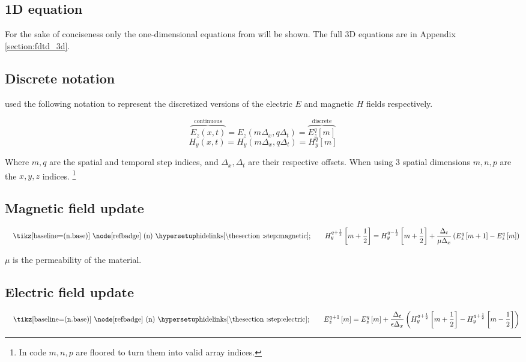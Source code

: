 \documentclass[../main.tex]{subfiles}
\begin{document}
\subsection{1D equation}

For the sake of conciseness only the one-dimensional equations from \citet{ufdtd} will be shown. The full 3D equations are in Appendix \ref{section:fdtd_3d}.

\subsection{Discrete notation}

\citet{ufdtd} used the following notation to represent the discretized versions of the electric $E$ and magnetic $H$ fields respectively.

\begin{equation}
	\overbrace{E_z(x,t)}^{\text{continuous}} = E_z(m\Delta_x, q\Delta_t) = \overbrace{E_z^q[m]}^{\text{discrete}}
\end{equation}
\begin{equation}
	H_y(x,t) = H_y(m\Delta_x, q\Delta_t) = H_y^q[m]
\end{equation}

Where $m,q$ are the spatial and temporal step indices, and $\Delta_x,\Delta_t$ are their respective offsets.
When using 3 spatial dimensions $m,n,p$ are the $x,y,z$ indices. \footnote{In code $m,n,p$ are floored to turn them into valid array indices.}

\subsection{Magnetic field update}


\begin{equation}
	\text{\blackcircleref{step:magnetic}\quad}
	H_y^{q+\frac{1}{2}} \left[m+\frac{1}{2}\right] = H_y^{q-\frac{1}{2}} \left[m+\frac{1}{2}\right] +\frac{\Delta_t}{\mu\Delta_x} \left(E_z^q\left[m+1\right]-E_z^q\left[m\right]\right)
\end{equation}

$\mu$ is the permeability of the material.

\subsection{Electric field update}


\begin{equation}
	\text{\blackcircleref{step:electric}\quad}
	E_z^{q+1}\left[m\right] = E_z^{q}\left[m\right] + \frac{\Delta_t}{\epsilon\Delta_x}\left(H_y^{q+\frac{1}{2}}\left[m+\frac{1}{2}\right]-H_y^{q+\frac{1}{2}}\left[m-\frac{1}{2}\right]\right)
\end{equation}
\end{document}
